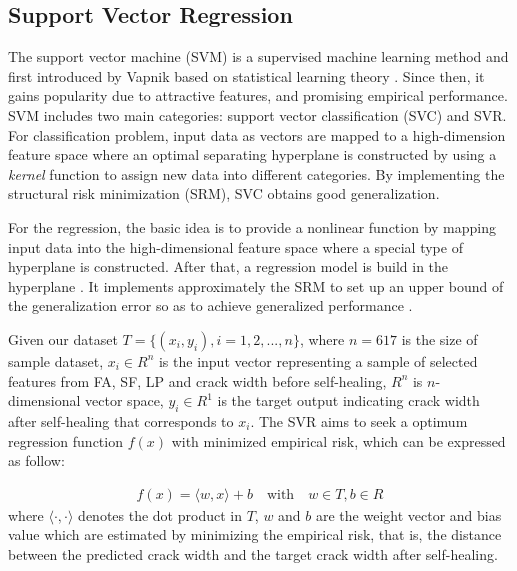 \documentclass[11pt]{article}
\begin{document}
	\subsection{Support Vector Regression}
	
	The support vector machine (SVM) is a supervised machine learning method and first introduced by Vapnik \cite{cortes1995support,vapnik1999overview} based on statistical learning theory \cite{juncai2015prediction}. Since then, it gains popularity due to attractive features, and promising empirical performance. SVM includes two main categories: support vector classification (SVC) and SVR. For classification problem, input data as vectors are mapped to a high-dimension feature space where an optimal separating hyperplane is constructed by using a \textit{kernel} function to assign new data into different categories\cite{suykens1999least}. By implementing the structural risk minimization (SRM), SVC obtains good generalization. 
	
	For the regression, the basic idea is to provide a nonlinear function by mapping input data into the high-dimensional feature space where a special type of hyperplane is constructed. After that, a regression model is build in the hyperplane \cite{li2007consensus}. It implements approximately the SRM to set up an upper bound of the generalization error so as to achieve generalized performance \cite{fang2008hybrid}.
	
	Given our dataset $T = \{ (x_i,y_i), i = 1,2,...,n\}$, where $n = 617$ is the size of sample dataset, $x_i \in R^n$ is the input vector representing a sample of selected features from FA, SF, LP and crack width before self-healing, $R^n$ is $n$-dimensional vector space, $y_i \in R^1$ is the target output indicating crack width after self-healing  that corresponds to $x_i$. The SVR aims to seek a optimum regression function $f(x)$ with minimized empirical risk, which can be expressed as follow:
	
	\begin{eqnarray}
	f(x) = \langle w,x \rangle + b \quad \text{with} \quad w \in T, b \in R                                                              
	\end{eqnarray}
	where $\langle \cdot, \cdot \rangle$ denotes the dot product in $T$, $w$ and $b$ are the weight vector and bias value which are estimated by minimizing the empirical risk, that is, the distance between the predicted crack width and the target crack width after self-healing.  
	
\end{document}
